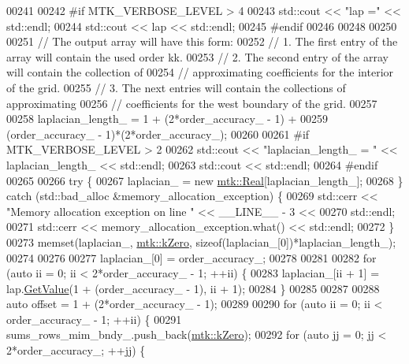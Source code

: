 \begin{DoxyCode}
00241 
00242 \textcolor{preprocessor}{  #if MTK\_VERBOSE\_LEVEL > 4}
00243   std::cout << \textcolor{stringliteral}{"lap ="} << std::endl;
00244   std::cout << lap << std::endl;
00245 \textcolor{preprocessor}{  #endif}
00246 
00248 
00250 
00251   \textcolor{comment}{// The output array will have this form:}
00252   \textcolor{comment}{// 1. The first entry of the array will contain the used order kk.}
00253   \textcolor{comment}{// 2. The second entry of the array will contain the collection of}
00254   \textcolor{comment}{// approximating coefficients for the interior of the grid.}
00255   \textcolor{comment}{// 3. The next entries will contain the collections of approximating}
00256   \textcolor{comment}{// coefficients for the west boundary of the grid.}
00257 
00258   laplacian\_length\_ = 1 + (2*order\_accuracy\_ - 1) +
00259     (order\_accuracy\_ - 1)*(2*order\_accuracy\_);
00260 
00261 \textcolor{preprocessor}{  #if MTK\_VERBOSE\_LEVEL > 2}
00262   std::cout << \textcolor{stringliteral}{"laplacian\_length\_ = "} << laplacian\_length\_ << std::endl;
00263   std::cout << std::endl;
00264 \textcolor{preprocessor}{  #endif}
00265 
00266   \textcolor{keywordflow}{try} \{
00267     laplacian\_ = \textcolor{keyword}{new} \hyperlink{group__c01-roots_gac080bbbf5cbb5502c9f00405f894857d}{mtk::Real}[laplacian\_length\_];
00268   \} \textcolor{keywordflow}{catch} (std::bad\_alloc &memory\_allocation\_exception) \{
00269     std::cerr << \textcolor{stringliteral}{"Memory allocation exception on line "} << \_\_LINE\_\_ - 3 <<
00270       std::endl;
00271     std::cerr << memory\_allocation\_exception.what() << std::endl;
00272   \}
00273   memset(laplacian\_, \hyperlink{group__c01-roots_ga59a451a5fae30d59649bcda274fea271}{mtk::kZero}, \textcolor{keyword}{sizeof}(laplacian\_[0])*laplacian\_length\_);
00274 
00276 
00277   laplacian\_[0] = order\_accuracy\_;
00278 
00281 
00282   \textcolor{keywordflow}{for} (\textcolor{keyword}{auto} ii = 0; ii < 2*order\_accuracy\_ - 1; ++ii) \{
00283     laplacian\_[ii + 1] = lap.\hyperlink{classmtk_1_1DenseMatrix_a4b23ecbebd970b5eea915dbb50691024}{GetValue}(1 + (order\_accuracy\_ - 1), ii + 1);
00284   \}
00285 
00287 
00288   \textcolor{keyword}{auto} offset = 1 + (2*order\_accuracy\_ - 1);
00289 
00290   \textcolor{keywordflow}{for} (\textcolor{keyword}{auto} ii = 0; ii < order\_accuracy\_ - 1; ++ii) \{
00291     sums\_rows\_mim\_bndy\_.push\_back(\hyperlink{group__c01-roots_ga59a451a5fae30d59649bcda274fea271}{mtk::kZero});
00292     \textcolor{keywordflow}{for} (\textcolor{keyword}{auto} jj = 0; jj < 2*order\_accuracy\_; ++jj) \{

\end{DoxyCode}
